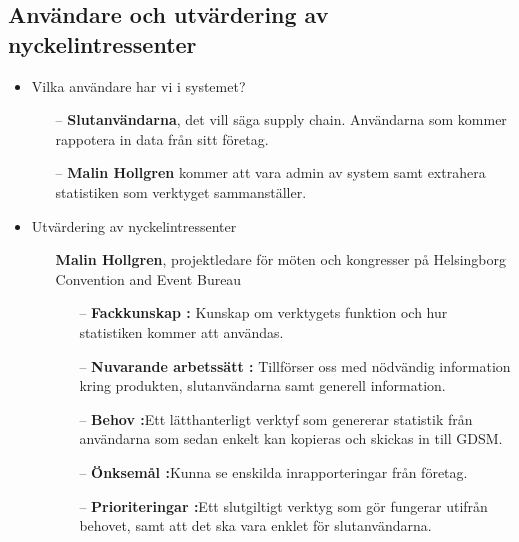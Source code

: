 \documentclass{article}
\begin{document}
    \subsection{Användare och utvärdering av nyckelintressenter}
    
    \begin{itemize}
        \item Vilka användare har vi i systemet?
            \begin{itemize}
                \item [--] \textbf{Slutanvändarna}, det vill säga supply chain. Användarna som kommer rappotera in data från sitt företag. 
                \item[--] \textbf{Malin Hollgren} kommer att vara admin av system samt extrahera statistiken som verktyget sammanställer. 
            \end{itemize}
        \item Utvärdering av nyckelintressenter
            \begin{itemize}
                \item [] \textbf{Malin Hollgren}, projektledare för möten och kongresser på Helsingborg Convention and Event Bureau
                    \begin{itemize}
                        \item[--] \textbf{Fackkunskap :} Kunskap om verktygets funktion och hur statistiken kommer att användas.
                        \\
                        \item[--] \textbf{Nuvarande arbetssätt :} Tillförser oss med nödvändig information kring produkten, slutanvändarna samt generell information.
                        \\
                        \item[--] \textbf{Behov :}Ett lätthanterligt verktyf som genererar statistik från användarna som sedan enkelt kan kopieras och skickas in till GDSM.
                        \\
                        \item[--] \textbf{Önksemål :}Kunna se enskilda inrapporteringar från företag.
                        \\
                        \item[--] \textbf{Prioriteringar :}Ett slutgiltigt verktyg som gör fungerar utifrån behovet, samt att det ska vara enklet för slutanvändarna.
                        \\
                    \end{itemize}
           

\end{itemize}
\end{itemize}
\end{document}

